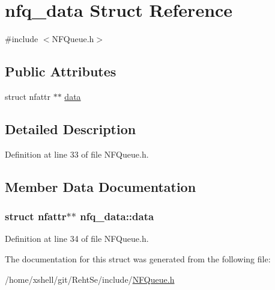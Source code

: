 \hypertarget{structnfq__data}{}\section{nfq\+\_\+data Struct Reference}
\label{structnfq__data}


{\ttfamily \#include $<$N\+F\+Queue.\+h$>$}

\subsection*{Public Attributes}
\begin{DoxyCompactItemize}
\item 
struct nfattr $\ast$$\ast$ \hyperlink{structnfq__data_ac44f5e55ab31da6358aed4691f76a646}{data}
\end{DoxyCompactItemize}


\subsection{Detailed Description}


Definition at line 33 of file N\+F\+Queue.\+h.



\subsection{Member Data Documentation}
\subsubsection[{\texorpdfstring{data}{data}}]{\setlength{\rightskip}{0pt plus 5cm}struct nfattr$\ast$$\ast$ nfq\+\_\+data\+::data}\hypertarget{structnfq__data_ac44f5e55ab31da6358aed4691f76a646}{}\label{structnfq__data_ac44f5e55ab31da6358aed4691f76a646}


Definition at line 34 of file N\+F\+Queue.\+h.



The documentation for this struct was generated from the following file\+:\begin{DoxyCompactItemize}
\item 
/home/xshell/git/\+Reht\+Se/include/\hyperlink{_n_f_queue_8h}{N\+F\+Queue.\+h}\end{DoxyCompactItemize}
